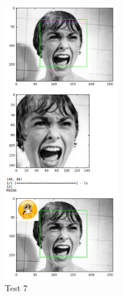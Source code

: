 \begin{frame}

\begin{figure}[!htbp]

   \centering
\includegraphics[angle=0,width=50mm]{Imagenes/test7.png}
    \caption{Test 7}
    \label{fig:test7} 

        
\end{figure}
\end{frame}



 
